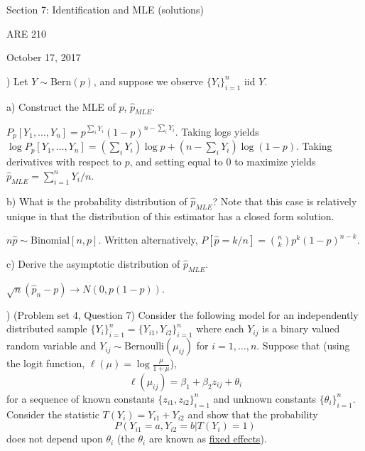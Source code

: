 \documentclass[12pt,english]{article}
\begin{document}
\begin{center}
{\Large{}Section 7: Identification and MLE (solutions)}
\par\end{center}{\Large \par}

\begin{center}
ARE 210
\par\end{center}

\begin{center}
October 17, 2017
\par\end{center}

) Let $Y \sim \text{Bern}(p)$, and suppose we observe $\{ Y_{i} \}_{i=1}^{n}$ iid $Y$.

a) Construct the MLE of $p$, $\widehat{p}_{MLE}$.
\vspace{1em}

$P_{p}[Y_{1}, \ldots, Y_{n}] = p^{\sum_{i} Y_{i}} (1 - p)^{n - \sum_{i} Y_{i}}$. Taking logs yields $\log P_{p}[Y_{1}, \ldots, Y_{n}] = (\sum_{i} Y_{i}) \log p + (n - \sum_{i} Y_{i}) \log (1 - p)$. Taking derivatives with respect to $p$, and setting equal to 0 to maximize yields $\hat{p}_{MLE} = \sum_{i=1}^{n} Y_{i} / n$.

\vspace{1em}
b) What is the probability distribution of $\widehat{p}_{MLE}$? Note that this case is relatively unique in that the distribution of this estimator has a closed form solution.
\vspace{1em}

$n \hat{p} \sim \text{Binomial}[n, p]$. Written alternatively, $P[\hat{p} = k/n] = \binom{n}{k} p^{k} (1 - p)^{n-k}$.

\vspace{1em}
c) Derive the asymptotic distribution of $\widehat{p}_{MLE}$.
\vspace{1em}

$\sqrt{n} (\hat{p}_{n} - p) \to N(0, p(1 - p))$.

\vspace{1em}
) (Problem set 4, Question 7) Consider the following model for an independently distributed sample $\{ Y_{i} \}_{i=1}^{n} = \{ Y_{i1}, Y_{i2} \}_{i=1}^{n}$ where each $Y_{ij}$ is a binary valued random variable and $Y_{ij} \sim \text{Bernoulli}(\mu_{ij})$ for $i = 1, \ldots, n$. Suppose that (using the logit function, $\ell(\mu) = \log \frac{\mu}{1 + \mu}$),
$$ \ell(\mu_{ij}) = \beta_{1} + \beta_{2} z_{ij} + \theta_{i} $$
for a sequence of known constants $\{ z_{i1}, z_{i2} \}_{i=1}^{n}$ and unknown constants $\{\theta_{i}\}_{i=1}^{n}$. Consider the statistic $T(Y_{i}) = Y_{i1} + Y_{i2}$ and show that the probability
$$ P(Y_{i1} = a, Y_{i2} = b | T(Y_{i}) = 1) $$
does not depend upon $\theta_{i}$ (the $\theta_{i}$ are known as \underline{fixed effects}).
\vspace{1em}
\end{document}
